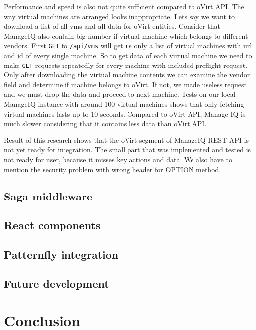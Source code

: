 Performance and speed is also not quite sufficient compared to oVirt API. The way virtual machines are arranged looks inappropriate. Lets say we want to download a list of all vms and all data for oVirt entities. Consider that ManageIQ also contain big number if virtual machine which belongs to different vendors. First \texttt{GET} to \texttt{/api/vms} will get us only a list of virtual machines with url and id of every single machine. So to get data of each virtual machine we need to make \texttt{GET} requests repeatedly for every machine with included preflight request. Only after downloading the virtual machine contents we can examine the vendor field and determine if machine belongs to oVirt. If not, we made useless request and we must drop the data and proceed to next machine. Tests on our local ManageIQ instance with around 100 virtual machines shows that only fetching virtual machines lasts up to 10 seconds. Compared to oVirt API, Manage IQ is much slower considering that it contains less data than oVirt API.  

Result of this research shows that the oVirt segment of ManageIQ REST API is not yet ready for integration. The small part that was implemented and tested is not ready for user, because it misses key actions and data. We also have to mention the security problem with wrong header for OPTION method.

\section{Saga middleware}

\section{React components}

\section{Patternfly integration}

\section{Future development}

\chapter{Conclusion}

